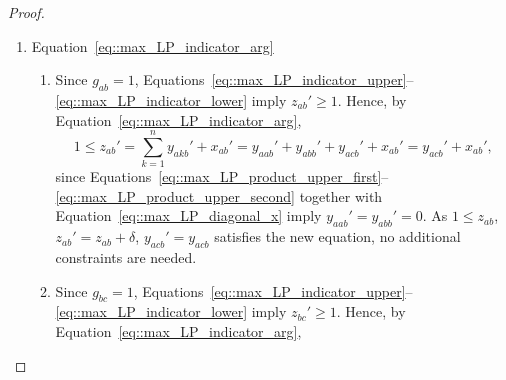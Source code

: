 \begin{proof}
\begin{enumerate}[label=\Alph*.]
\begin{enumerate}[label=(\roman*)]
          \begin{equation} \label{eq::y_aba}
            y_{aba}' = x_{ab}'
          \end{equation} 
          is an additional constraint that is needed.
        \item  Since $g_{bb}=0$, Equations~\eqref{eq::max_LP_indicator_upper}--\eqref{eq::max_LP_indicator_lower} imply $z_{bb}'=0$. Therefore, as in above
          \[
          0 = z_{bb}' = \sum_{k\in\{a,b,c\}}y_{bkb}' -\sum_{k\in\{a,b,c\}}x_{bk}' = y_{bab}' + y_{bcb}' - x_{ba}' - x_{bc}'.
          \]
          Since $x_{ba}'=x_{ab}'$ by Equation~\eqref{eq::max_LP_symmetry_x} and
          $x_{bc}'=x_{bc}$, it follows that
          \begin{equation} \label{eq::y_bab_bcb}
            y_{bab}' + y_{bcb}' = x_{ab}' + x_{bc}'
          \end{equation}
          is an additional constraint that is needed.
        \item Since $g_{cc}=0$, Equations~\eqref{eq::max_LP_indicator_upper}--\eqref{eq::max_LP_indicator_lower} imply $z_{cc}'=0$. Therefore, as in above
          \[
          0 = \sum_{k\in\{a,b,c\}}y_{ckc}' -\sum_{k\in\{a,b,c\}}x_{ck}' = y_{cac}' + y_{cbc}' - x_{ca}' -x_{cb}'.
          \]
          Since $x_{ca}'=0=x_{ca}$ by Lemma~\ref{lemma::two_edges_linear_sum} and $x_{cb}'=x_{bc}$, this equation is unchanged and the original values of $y_{cac}'=y_{cac}$ and $y_{cbc}'=y_{cbc}$ remain feasible and no additional constraints are needed. 
      \end{enumerate}
    \item Equation~\eqref{eq::max_LP_indicator_arg}
      \begin{enumerate}[label=(\roman*)]
        \item Since $g_{ab}=1$, Equations~\eqref{eq::max_LP_indicator_upper}--\eqref{eq::max_LP_indicator_lower} imply $z_{ab}' \geq 1$. Hence, by Equation~\eqref{eq::max_LP_indicator_arg},
          \[
          1 \leq z_{ab}' = \sum_{k = 1}^{n}y_{akb}' + x_{ab}' = y_{aab}'+y_{abb}'+y_{acb}'+x_{ab}'=y_{acb}'+x_{ab}',
          \]
          since Equations~\eqref{eq::max_LP_product_upper_first}--\eqref{eq::max_LP_product_upper_second} together with Equation~\eqref{eq::max_LP_diagonal_x} imply $y_{aab}'=y_{abb}'=0$.  As $1 \leq z_{ab}$, $z_{ab}' = z_{ab} + \delta$, $y_{acb}' = y_{acb}$ satisfies the new equation, no additional constraints are needed. 
        \item  Since $g_{bc}=1$, Equations~\eqref{eq::max_LP_indicator_upper}--\eqref{eq::max_LP_indicator_lower} imply $z_{bc}'\geq 1$. Hence, by Equation~\eqref{eq::max_LP_indicator_arg},

\end{enumerate}
\end{enumerate}
\end{proof}
